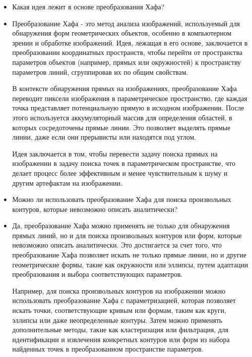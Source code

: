 \setcounter{question}{0}

\newcommand{\question}[1]{\item[Q\refstepcounter{question}\thequestion.] #1}
\newcommand{\answer}[1]{\item[A\thequestion.] #1}

\begin{itemize}

\question{Какая идея лежит в основе преобразования Хафа?}
\answer{Преобразование Хафа - это метод анализа изображений, используемый для обнаружения форм геометрических объектов, особенно в компьютерном зрении и обработке изображений. Идея, лежащая в его основе, заключается в преобразовании координатных пространств, чтобы перейти от пространства параметров объектов (например, прямых или окружностей) к пространству параметров линий, сгруппировав их по общим свойствам.

В контексте обнаружения прямых на изображениях, преобразование Хафа переводит пиксели изображения в параметрическое пространство, где каждая точка представляет потенциальную прямую в исходном изображении. После этого используется аккумуляторный массив для определения областей, в которых сосредоточены прямые линии. Это позволяет выделять прямые линии, даже если они прерывисты или находятся под углом.

Идея заключается в том, чтобы перевести задачу поиска прямых на изображении в задачу поиска точек в параметрическом пространстве, что делает процесс более эффективным и менее чувствительным к шуму и другим артефактам на изображении.}

\question{Можно ли использовать преобразование Хафа для поиска
произвольных контуров, которые невозможно описать аналитически?}
\answer{

Да, преобразование Хафа можно применять не только для обнаружения прямых линий, но и для поиска произвольных контуров или форм, которые невозможно описать аналитически. Это достигается за счет того, что преобразование Хафа позволяет искать не только прямые линии, но и другие геометрические формы, такие как окружности или эллипсы, путем адаптации преобразования и выбора соответствующих параметров.

Например, для поиска произвольных контуров на изображении можно использовать преобразование Хафа с параметризацией, которая позволяет искать точки, соответствующие кривым или формам, таким как круги, эллипсы или даже неопределенные контуры. Затем можно применять дополнительные методы, такие как кластеризация или фильтрация, для идентификации и извлечения конкретных контуров или форм из набора найденных точек в преобразованном пространстве параметров.

}
\end{itemize}
